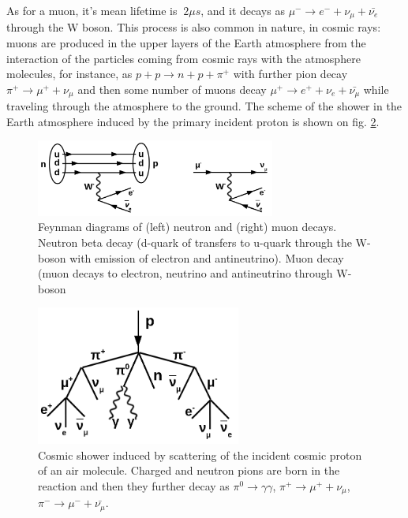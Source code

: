 As for a muon, it's mean lifetime is $~2 {\mu}s$, and it decays as ${\mu}^- \rightarrow e^- + {\nu}_{\mu} + \bar{{\nu}_e}$ through the W boson. This process is also common in nature, in cosmic rays: muons are produced in the upper layers of the Earth atmosphere from the interaction of the particles coming from cosmic rays with the atmosphere molecules, for instance, as $p+p \rightarrow n+p+\pi^+$ with further pion decay $\pi^+ \rightarrow \mu^+ + \nu_\mu$ and then some number of muons decay $\mu^+ \rightarrow e^+ + \nu_e + \bar{\nu_\mu}$ while traveling through the atmosphere to the ground. The scheme of the shower in the Earth atmosphere induced by the primary incident proton is shown on fig. \ref{fig:cosmicMuons}.   

\begin{figure}
\caption{Feynman diagrams of (left) neutron and (right) muon decays. Neutron beta decay (d-quark of transfers to u-quark through the W-boson with emission of electron and antineutrino). Muon decay (muon decays to electron, neutrino and antineutrino through W-boson}
\label{fig:MuonAndNeutronDecays}
\centering
\includegraphics[width=0.70\textwidth, keepaspectratio=true]{figs/NeutronAndMuonDecays.png}
\end{figure}

\begin{figure}
\caption{Cosmic shower induced by scattering of the incident cosmic proton of an air molecule. Charged and neutron pions are born in the reaction and then they further decay as $\pi^0 \rightarrow \gamma\gamma$, $\pi^+ \rightarrow \mu^+ + \nu_\mu$, $\pi^- \rightarrow \mu^- + \bar{\nu_\mu}$.}
\label{fig:cosmicMuons}
\centering
\includegraphics[width=0.60\textwidth, keepaspectratio=true]{figs/cosmicMuons.png}
\end{figure}



